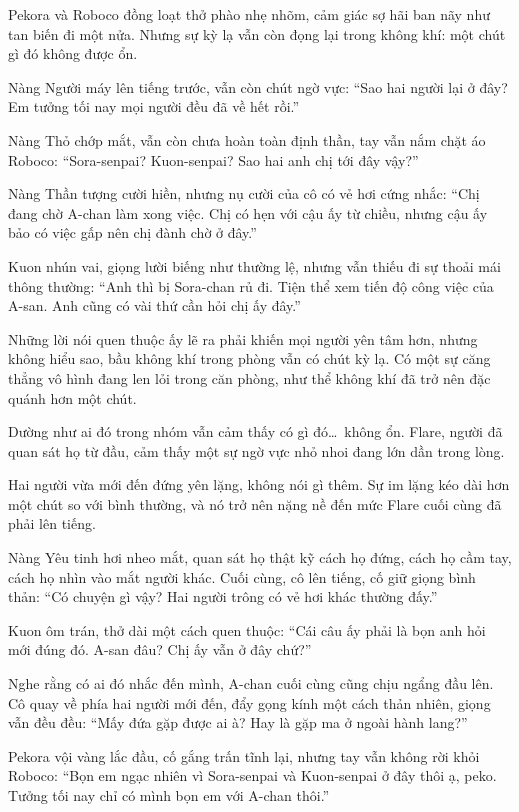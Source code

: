 \documentclass[../main.tex]{subfiles}
\begin{document}
Pekora và Roboco đồng loạt thở phào nhẹ nhõm, cảm giác sợ hãi ban nãy như tan biến đi một nửa. Nhưng sự kỳ lạ vẫn còn đọng lại trong không khí: một chút gì đó không được ổn.

Nàng Người máy lên tiếng trước, vẫn còn chút ngờ vực: ``Sao hai người lại ở đây? Em tưởng tối nay mọi người đều đã về hết rồi.''

Nàng Thỏ chớp mắt, vẫn còn chưa hoàn toàn định thần, tay vẫn nắm chặt áo Roboco: ``Sora-senpai? Kuon-senpai? Sao hai anh chị tới đây vậy?''

Nàng Thần tượng cười hiền, nhưng nụ cười của cô có vẻ hơi cứng nhắc: ``Chị đang chờ A-chan làm xong việc. Chị có hẹn với cậu ấy từ chiều, nhưng cậu ấy bảo có việc gấp nên chị đành chờ ở đây.''

Kuon nhún vai, giọng lười biếng như thường lệ, nhưng vẫn thiếu đi sự thoải mái thông thường: ``Anh thì bị Sora-chan rủ đi. Tiện thể xem tiến độ công việc của A-san. Anh cũng có vài thứ cần hỏi chị ấy đây.''

Những lời nói quen thuộc ấy lẽ ra phải khiến mọi người yên tâm hơn, nhưng không hiểu sao, bầu không khí trong phòng vẫn có chút kỳ lạ. Có một sự căng thẳng vô hình đang len lỏi trong căn phòng, như thể không khí đã trở nên đặc quánh hơn một chút.

Dường như ai đó trong nhóm vẫn cảm thấy có gì đó\dots\ không ổn. Flare, người đã quan sát họ từ đầu, cảm thấy một sự ngờ vực nhỏ nhoi đang lớn dần trong lòng.

Hai người vừa mới đến đứng yên lặng, không nói gì thêm. Sự im lặng kéo dài hơn một chút so với bình thường, và nó trở nên nặng nề đến mức Flare cuối cùng đã phải lên tiếng.

Nàng Yêu tinh hơi nheo mắt, quan sát họ thật kỹ cách họ đứng, cách họ cầm tay, cách họ nhìn vào mắt người khác. Cuối cùng, cô lên tiếng, cố giữ giọng bình thản: ``Có chuyện gì vậy? Hai người trông có vẻ hơi khác thường đấy.''

Kuon ôm trán, thở dài một cách quen thuộc: ``Cái câu ấy phải là bọn anh hỏi mới đúng đó. A-san đâu? Chị ấy vẫn ở đây chứ?''

Nghe rằng có ai đó nhắc đến mình, A-chan cuối cùng cũng chịu ngẩng đầu lên. Cô quay về phía hai người mới đến, đẩy gọng kính một cách thản nhiên, giọng vẫn đều đều: ``Mấy đứa gặp được ai à? Hay là gặp ma ở ngoài hành lang?''

Pekora vội vàng lắc đầu, cố gắng trấn tĩnh lại, nhưng tay vẫn không rời khỏi Roboco: ``Bọn em ngạc nhiên vì Sora-senpai và Kuon-senpai ở đây thôi ạ, peko. Tưởng tối nay chỉ có mình bọn em với A-chan thôi.''
\end{document}
